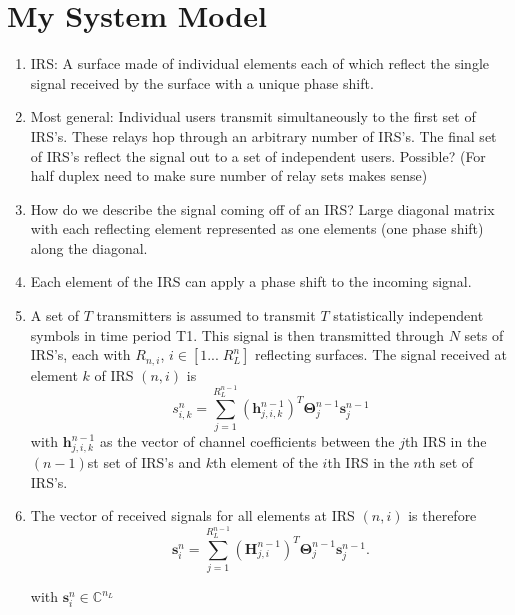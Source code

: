 \documentclass[12pt,a4paper]{report}
\begin{document}
\section{My System Model}
\begin{enumerate}
\item IRS: A surface made of individual elements each of which reflect the single signal received by the surface with a unique phase shift.
\item Most general: Individual users transmit simultaneously to the first set of IRS's. These relays hop through an arbitrary number of IRS's. The final set of IRS's reflect the signal out to a set of independent users. Possible? (For half duplex need to make sure number of relay sets makes sense)
\item How do we describe the signal coming off of an IRS? Large diagonal matrix with each reflecting element represented as one elements (one phase shift) along the diagonal. 
\item
Each element of the IRS can apply a phase shift to the incoming signal.
\item 
A set of $T$ transmitters is assumed to transmit $T$ statistically independent symbols in time period T1. This signal is then transmitted through $N$ sets of IRS's, each with $R_{n,i}$, $i \in [1... \; R^n_L]$ reflecting surfaces. The signal received at element $k$ of IRS $(n,i)$ is 
\begin{equation}
s^{n}_{i,k} = \sum_{j = 1}^{R^{n-1}_L} (\mathbf{h}^{n-1}_{j,i,k})^T \boldsymbol{\Theta}^{n-1}_{j}\mathbf{s}^{n-1}_{j}
\end{equation}
with $\mathbf{h}^{n-1}_{j,i,k}$ as the vector of channel coefficients between the $j$th IRS in the $(n-1)$st set of IRS's and $k$th element of the $i$th IRS in the $n$th set of IRS's.

\item
The vector of received signals for all elements at IRS $(n,i)$ is therefore
\begin{equation}
\mathbf{s}^{n}_{i} = \sum_{j = 1}^{R^{n-1}_L} (\mathbf{H}^{n-1}_{j,i})^T\boldsymbol{\Theta}^{n-1}_{j}\mathbf{s}^{n-1}_{j}.
\end{equation}

with $\mathbf{s}^{n}_{i} \in \mathbb{C}^{n_L}$

\end{enumerate}


\end{document}
